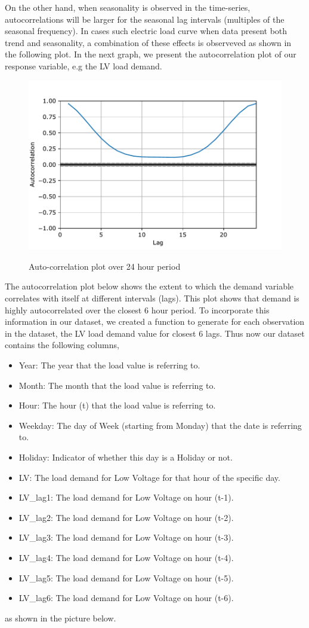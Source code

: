 On the other hand, when seasonality is observed in the time-series, autocorrelations will be larger for the seasonal lag intervals (multiples of the seasonal frequency). In cases such electric load curve when data present both trend and seasonality, a combination of these effects is observeved as shown in the following plot. In the next graph, we present the autocorrelation plot of our response variable, e.g the LV load demand. 
\begin{figure}[h!]
\centering
\includegraphics[width=0.6\linewidth]{project/ac.pdf}
\label{fig:felix}
\caption{Auto-correlation plot over 24 hour period}
\end{figure}
\par The autocorrelation plot below shows the extent to which the demand variable correlates with itself at different intervals (lags). This plot shows that demand is highly autocorrelated over the closest 6 hour period. To incorporate this information in our dataset, we created a function to generate for each observation in the dataset, the LV load demand value for closest 6 lags. Thus now our dataset contains the following columns, 
\begin{itemize}
    \item Year: The year that the load value is referring to.
    \item Month: The month that the load value is referring to.
    \item Hour: The hour (t) that the load value is referring to.
    \item Weekday: The day of Week (starting from Monday) that the date is referring to.
    \item Holiday: Indicator of whether this day is a Holiday or not.
    \item LV: The load demand for Low Voltage for that hour of the specific day.
    \item LV\_lag1: The load demand for Low Voltage on hour (t-1). 
    \item LV\_lag2: The load demand for Low Voltage on hour (t-2). 
    \item LV\_lag3: The load demand for Low Voltage on hour (t-3). 
    \item LV\_lag4: The load demand for Low Voltage on hour (t-4). 
    \item LV\_lag5: The load demand for Low Voltage on hour (t-5). 
    \item LV\_lag6: The load demand for Low Voltage on hour (t-6). 
\end{itemize}
as shown in the picture below.


